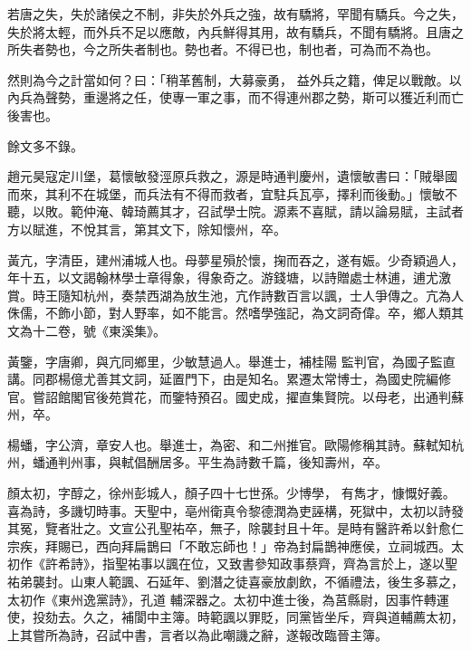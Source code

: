 \begin{pinyinscope}
 若唐之失，失於諸侯之不制，非失於外兵之強，故有驕將，罕聞有驕兵。今之失，失於將太輕，而外兵不足以應敵，內兵鮮得其用，故有驕兵，不聞有驕將。且唐之所失者勢也，今之所失者制也。勢也者。不得已也，制也者，可為而不為也。



 然則為今之計當如何？曰：「稍革舊制，大募豪勇，
 益外兵之籍，俾足以戰敵。以內兵為聲勢，重邊將之任，使專一軍之事，而不得連州郡之勢，斯可以獲近利而亡後害也。



 餘文多不錄。



 趙元昊寇定川堡，葛懷敏發涇原兵救之，源是時通判慶州，遺懷敏書曰：「賊舉國而來，其利不在城堡，而兵法有不得而救者，宜駐兵瓦亭，擇利而後動。」懷敏不聽，以敗。範仲淹、韓琦薦其才，召試學士院。源素不喜賦，請以論易賦，主試者方以賦進，不悅其言，第其文下，除知懷州，卒。



 黃亢，字清臣，建州浦城人也。母夢星殞於懷，掬而吞之，遂有娠。少奇穎過人，年十五，以文謁翰林學士章得象，得象奇之。游錢塘，以詩贈處士林逋，逋尤激賞。時王隨知杭州，奏禁西湖為放生池，亢作詩數百言以諷，士人爭傳之。亢為人侏儒，不飾小節，對人野率，如不能言。然嗜學強記，為文詞奇偉。卒，鄉人類其文為十二卷，號《東溪集》。



 黃鑒，字唐卿，與亢同鄉里，少敏慧過人。舉進士，補桂陽
 監判官，為國子監直講。同郡楊億尤善其文詞，延置門下，由是知名。累遷太常博士，為國史院編修官。嘗詔館閣官後苑賞花，而鑒特預召。國史成，擢直集賢院。以母老，出通判蘇州，卒。



 楊蟠，字公濟，章安人也。舉進士，為密、和二州推官。歐陽修稱其詩。蘇軾知杭州，蟠通判州事，與軾倡酬居多。平生為詩數千篇，後知壽州，卒。



 顏太初，字醇之，徐州彭城人，顏子四十七世孫。少博學，
 有雋才，慷慨好義。喜為詩，多譏切時事。天聖中，亳州衛真令黎德潤為吏誣構，死獄中，太初以詩發其冤，覽者壯之。文宣公孔聖祐卒，無子，除襲封且十年。是時有醫許希以針愈仁宗疾，拜賜已，西向拜扁鵲曰「不敢忘師也！」帝為封扁鵲神應侯，立祠城西。太初作《許希詩》，指聖祐事以諷在位，又致書參知政事蔡齊，齊為言於上，遂以聖祐弟襲封。山東人範諷、石延年、劉潛之徒喜豪放劇飲，不循禮法，後生多慕之，太初作《東州逸黨詩》，孔道
 輔深器之。太初中進士後，為莒縣尉，因事忤轉運使，投劾去。久之，補閬中主簿。時範諷以罪貶，同黨皆坐斥，齊與道輔薦太初，上其嘗所為詩，召試中書，言者以為此嘲譏之辭，遂報改臨晉主簿。




\end{pinyinscope}
